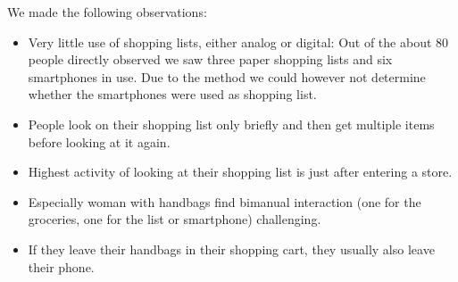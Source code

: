 \documentclass{scrartcl}
\begin{document}
      We made the following observations:
      \begin{itemize}
        \item Very little use of shopping lists, either analog or digital: Out of the about 80 people directly observed we saw three paper shopping lists and six smartphones in use. 
          Due to the method we could however not determine whether the smartphones were used as shopping list.
        \item People look on their shopping list only briefly and then get multiple items before looking at it again.
        \item Highest activity of looking at their shopping list is just after entering a store.
        \item Especially woman with handbags find bimanual interaction (one for the groceries, one for the list or smartphone) challenging.
        \item If they leave their handbags in their shopping cart, they usually also leave their phone.
      \end{itemize}
\end{document}
